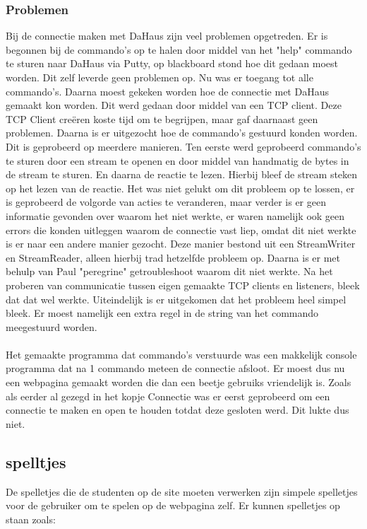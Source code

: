 \documentclass[11pt]{article}
\begin{document}
	\subsubsection{Problemen}
	
	Bij de connectie maken met DaHaus zijn veel problemen opgetreden. 
	Er is begonnen bij de commando's op te halen door middel van het "help" commando te sturen naar DaHaus via Putty, op blackboard stond hoe dit gedaan moest worden. Dit zelf leverde geen problemen op. Nu was er toegang tot alle commando's. Daarna moest gekeken worden hoe de connectie met DaHaus gemaakt kon worden. Dit werd gedaan door middel van een TCP client. Deze TCP Client cre\"{e}ren koste tijd om te begrijpen, maar gaf daarnaast geen problemen. Daarna is er uitgezocht hoe de commando's gestuurd konden worden. Dit is geprobeerd op meerdere manieren. Ten eerste werd geprobeerd commando's te sturen door een stream te openen en door middel van handmatig de bytes in de stream te sturen. En daarna de reactie te lezen. Hierbij bleef de stream steken op het lezen van de reactie. Het was niet gelukt om dit probleem op te lossen, er is geprobeerd de volgorde van acties te veranderen, maar verder is er geen informatie gevonden over waarom het niet werkte, er waren namelijk ook geen errors die konden uitleggen waarom de connectie vast liep, omdat dit niet werkte is er naar een andere manier gezocht. Deze manier bestond uit een StreamWriter en StreamReader, alleen hierbij trad hetzelfde probleem op. Daarna is er met behulp van Paul "peregrine" getroubleshoot waarom dit niet werkte. Na het proberen van communicatie tussen eigen gemaakte TCP clients en listeners, bleek dat dat wel werkte. Uiteindelijk is er uitgekomen dat het probleem heel simpel bleek. Er moest namelijk een extra regel in de string van het commando meegestuurd worden.
	\\
	\\
	Het gemaakte programma dat commando's verstuurde was een makkelijk console programma dat na 1 commando meteen de connectie afsloot. Er moest dus nu een webpagina gemaakt worden die dan een beetje gebruiks vriendelijk is. Zoals als eerder al gezegd in het kopje Connectie was er eerst geprobeerd om een connectie te maken en open te houden totdat deze gesloten werd. Dit lukte dus niet.
	\subsection{spelltjes}
	De spelletjes die de studenten op de site moeten verwerken zijn simpele spelletjes voor de gebruiker om te spelen op de webpagina zelf. Er kunnen spelletjes op staan zoals: 
\end{document}
